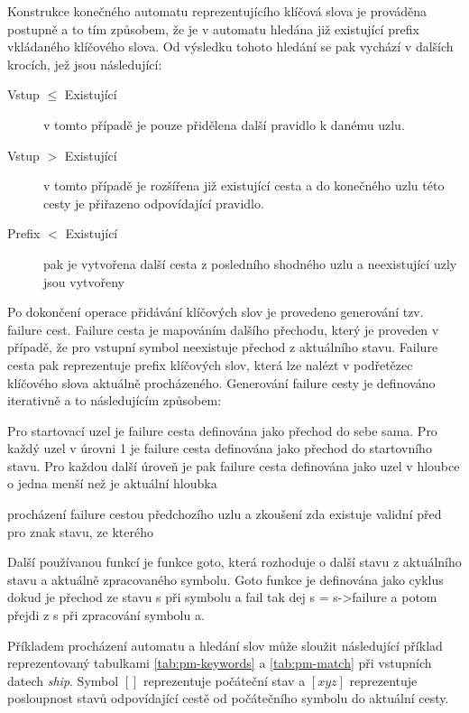 Konstrukce konečného automatu reprezentujícího klíčová slova je prováděna postupně a to tím způsobem,
že je v automatu hledána již existující prefix vkládaného klíčového slova. Od výsledku tohoto hledání
se pak vychází v dalších krocích, jež jsou následující:

\begin{description}
    \item[Vstup  $\leq$ Existující] v tomto případě je pouze přidělena další pravidlo k danému uzlu.

    \item[Vstup $>$ Existující] v tomto případě je rozšířena již existující cesta a do konečného
    uzlu této cesty je přiřazeno odpovídající pravidlo.
    \item[Prefix $<$ Existující] pak je vytvořena další cesta z posledního shodného uzlu a neexistující uzly jsou vytvořeny
\end{description}

Po dokončení operace přidávání klíčových slov je provedeno generování tzv. failure cest.
Failure cesta je mapováním dalšího přechodu, který je proveden v případě, že pro vstupní symbol neexistuje
přechod z aktuálního stavu. Failure cesta pak reprezentuje prefix klíčových slov,
která lze nalézt v podřetězec klíčového slova aktuálně procházeného.
Generování failure cesty je definováno iterativně a to následujícím způsobem:

Pro startovací uzel je failure cesta definována jako přechod do sebe sama.
Pro každý uzel v úrovni 1 je failure cesta definována jako přechod do startovního stavu.
Pro každou další úroveň je pak failure cesta definována jako uzel v hloubce o jedna menší než je aktuální hloubka

procházení failure cestou předchozího uzlu a zkoušení zda existuje validní před pro znak stavu, ze kterého

Další používanou funkcí je funkce goto, která rozhoduje o další stavu z aktuálního stavu a aktuálně
zpracovaného symbolu. Goto funkce je definována jako cyklus dokud
je přechod ze stavu s při symbolu a fail tak dej s = s->failure
a potom přejdi z s při zpracování symbolu a.

Příkladem procházení automatu a hledání slov může sloužit následující příklad reprezentovaný tabulkami
\ref{tab:pm-keywords} a \ref{tab:pm-match} při vstupních datech \textit{ship}.
Symbol $[]$ reprezentuje počáteční stav a $[xyz]$ reprezentuje posloupnost stavů odpovídající cestě od
počátečního symbolu do aktuální cesty.

